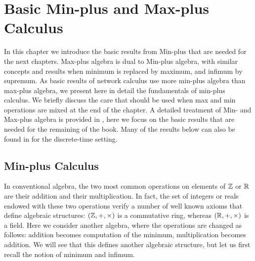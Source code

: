 \chapter{Basic Min-plus and Max-plus Calculus}
\label{L10}
In this chapter we introduce the basic results from Min-plus that
are needed for the next chapters. Max-plus algebra is dual to
Min-plus algebra, with  similar concepts and results when minimum
is replaced by maximum, and infimum by supremum. As basic results
of network calculus use more min-plus algebra than max-plus
algebra, we present here in detail the fundamentals of min-plus
calculus. We briefly discuss the care that should be used when max
and min operations are mixed at the end of the chapter. A detailed
treatment of Min- and Max-plus algebra is provided in
\cite{maxPlus}, here we focus on the basic results that are needed
for the remaining of the book. Many of the results below can also
be found in \cite{Changbook} for the discrete-time setting.
\section{Min-plus Calculus}
In conventional algebra, the two most common operations on
elements of $\mathbb{Z}$ or $\mathbb{R}$ are their addition and their
multiplication. In fact, the set of integers or reals endowed with
these two operations verify a number of well known axioms that
define algebraic structures: $(\mathbb{Z}, +, \times)$  is a
commutative ring, whereas $(\mathbb{R}, +, \times)$ is a field.
 Here we consider another algebra, where the operations are changed as follows:
addition becomes computation of the minimum,
multiplication becomes addition. We will see that this defines another algebraic structure,
but let us first recall the notion of minimum and infimum.

